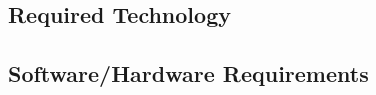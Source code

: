 \documentclass{extarticle}
\begin{document}
\subsection{Required Technology}


\subsection{Software/Hardware Requirements}
\end{document}

